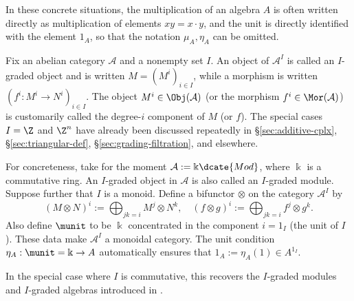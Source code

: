 In these concrete situations, the multiplication of an algebra $A$ is often
written directly as multiplication of elements $xy=x\cdot y$, and the unit
is directly identified with the element $1_A$, so that the notation
$\mu_A,\eta_A$ can be omitted.

\begin{example}\label{eg:graded-module}
	Fix an abelian category $\mathcal{A}$ and a nonempty set $I$. An object of
	$\mathcal{A}^I$ is called an $I$-graded object and is written
	$M=(M^i)_{i\in I}$, while a morphism is written
	$(f^i:M^i\to N^i)_{i\in I}$. The object
	$M^i\in\Obj(\mathcal{A})$ (or the morphism
	$f^i\in\Mor(\mathcal{A})$) is customarily called the degree-$i$
	component of $M$ (or $f$). The special cases $I=\Z$ and $\Z^n$ have
	already been discussed repeatedly in \S\ref{sec:additive-cplx},
	\S\ref{sec:triangular-def}, \S\ref{sec:grading-filtration}, and elsewhere.
	
	For concreteness, take for the moment
	$\mathcal{A}:=\Bbbk\dcate{Mod}$, where $\Bbbk$ is a commutative ring.
	An $I$-graded object in $\mathcal{A}$ is also called an $I$-graded module.
	Suppose further that $I$ is a monoid. Define a bifunctor $\otimes$ on the
	category $\mathcal{A}^I$ by
	\begin{equation}\label{eqn:graded-module}
		(M \otimes N)^i := \bigoplus_{jk=i} M^j \otimes N^k, \quad (f \otimes g)^i := \bigoplus_{jk=i} f^j \otimes g^k .
	\end{equation}
	Also define $\munit$ to be $\Bbbk$ concentrated in the component
	$i=1_I$ (the unit of $I$). These data make $\mathcal{A}^I$ a monoidal
	category. The unit condition $\eta_A:\munit=\Bbbk\to A$ automatically
	ensures that $1_A:=\eta_A(1)\in A^{1_I}$.
	
	In the special case where $I$ is commutative, this recovers the
	$I$-graded modules and $I$-graded algebras introduced in
	\cite[Definition 7.4.1]{Li1}.


\end{example}
